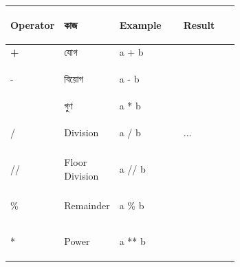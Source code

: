 \begin{tabularx}
{\linewidth}
{
|>{\bfseries\centering\arraybackslash}p{0.13\linewidth}
|>{\RaggedRight\arraybackslash}p{0.24\linewidth}
|>{\RaggedRight\arraybackslash}p{0.29\linewidth}
|Y|
}

\hline
{}

\textbf{Operator}
&
\textbf{কাজ}
&
\textbf{Example}
&
\textbf{Result}
\\
\hline

\textenglish{\ttfamily +}
& যোগ
& \textenglish{\ttfamily a + b}
& \textenglish{}
\\
\hline

\textenglish{\ttfamily -}
& বিয়োগ
& \textenglish{\ttfamily a - b}
& \textenglish{}
\\
\hline

\textenglish{\ttfamily *}
& গুণ
& \textenglish{\ttfamily a * b}
& \textenglish{}
\\
\hline

\textenglish{\ttfamily /}
& Division
& \textenglish{\ttfamily a / b}
& \textenglish{...}
\\
\hline

\textenglish{\ttfamily //}
& Floor Division
& \textenglish{\ttfamily a // b}
& \textenglish{}
\\
\hline

\textenglish{\ttfamily \%}
& Remainder
& \textenglish{\ttfamily a \% b}
& \textenglish{}
\\
\hline

\textenglish{\ttfamily **}
& Power
& \textenglish{\ttfamily a ** b}
& \textenglish{}
\\
\hline

\end{tabularx}


